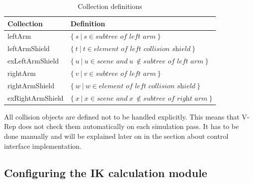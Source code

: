 \begin{table}
  \centering
  \begin{tabular}[h]{|l|l|} \hline
	\textbf{Collection} & \textbf{Definition} \\ \hline
	leftArm & $\{~s~|~s\in\textit{subtree of left arm}~\}$ \\
	leftArmShield & $\{~t~|~t\in\textit{element of left collision shield}~\}$ \\
	exLeftArmShield & $\{~u~|~u\in\textit{scene and}~u~\notin\textit{subtree of left arm}~\}$ \\
	rightArm & $\{~v~|~v\in\textit{subtree of left arm}~\}$ \\
	rightArmShield & $\{~w~|~w\in\textit{element of left collision shield}~\}$ \\
	exRightArmShield & $\{~x~|~x\in\textit{scene and}~x~\notin\textit{subtree of right arm}~\}$ \\ \hline
  \end{tabular}
  \caption{Collection definitions}
  \label{fig:col_defs}
\end{table}
All collision objects are defined not to be handled explicitly. This means that V-Rep does not check them automatically on each simulation pass. It has to be done manually and will be explained later on in the section about control interface implementation.

\subsection{Configuring the IK calculation module}
\label{sec:config_ik}

